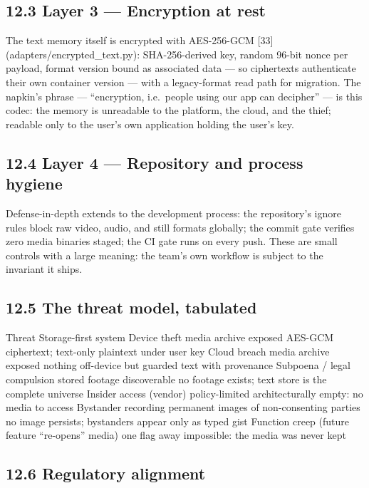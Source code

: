 \subsection{12.3 Layer 3 --- Encryption at rest}\label{layer-3-encryption-at-rest}

The text memory itself is encrypted with AES-256-GCM {[}33{]} (adapters/encrypted\_text.py): SHA-256-derived key, random 96-bit nonce per payload, format version bound as associated data --- so ciphertexts authenticate their own container version --- with a legacy-format read path for migration. The napkin's phrase --- ``encryption, i.e.~people using our app can decipher'' --- is this codec: the memory is unreadable to the platform, the cloud, and the thief; readable only to the user's own application holding the user's key.

\subsection{12.4 Layer 4 --- Repository and process hygiene}\label{layer-4-repository-and-process-hygiene}

Defense-in-depth extends to the development process: the repository's ignore rules block raw video, audio, and still formats globally; the commit gate verifies zero media binaries staged; the CI gate runs on every push. These are small controls with a large meaning: the team's own workflow is subject to the invariant it ships.

\subsection{12.5 The threat model, tabulated}\label{the-threat-model-tabulated}

Threat Storage-first system Device theft media archive exposed AES-GCM ciphertext; text-only plaintext under user key Cloud breach media archive exposed nothing off-device but guarded text with provenance Subpoena / legal compulsion stored footage discoverable no footage exists; text store is the complete universe Insider access (vendor) policy-limited architecturally empty: no media to access Bystander recording permanent images of non-consenting parties no image persists; bystanders appear only as typed gist Function creep (future feature ``re-opens'' media) one flag away impossible: the media was never kept

\subsection{12.6 Regulatory alignment}\label{regulatory-alignment}

